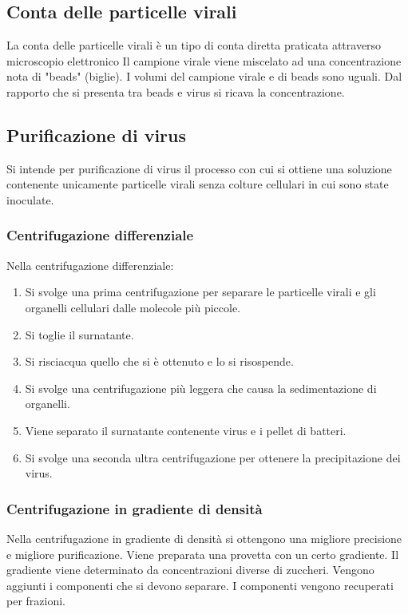 	\subsection{Conta delle particelle virali}
	La conta delle particelle virali \`e un tipo di conta diretta praticata attraverso microscopio elettronico
	Il campione virale viene miscelato ad una concentrazione nota di "beads" (biglie). 
	I volumi del campione virale e di beads sono uguali. 
	Dal rapporto che si presenta tra beads e virus si ricava la concentrazione. 

	\subsection{Purificazione di virus}
	Si intende per purificazione di virus il processo con cui si ottiene una soluzione contenente unicamente particelle virali senza colture cellulari in cui sono state inoculate.

		\subsubsection{Centrifugazione differenziale}
		Nella centrifugazione differenziale:
		\begin{multicols}{2}
			\begin{enumerate}
				\item Si svolge una prima centrifugazione per separare le particelle virali e gli organelli cellulari dalle molecole più piccole.
    				\item Si toglie il surnatante.
    				\item Si risciacqua quello che si è ottenuto e lo si risospende.
    				\item Si svolge una centrifugazione pi\`u leggera che causa la sedimentazione di organelli.
				\item Viene separato il surnatante contenente virus e i pellet di batteri.
    				\item Si svolge una seconda ultra centrifugazione per ottenere la precipitazione dei virus. 
			\end{enumerate}
		\end{multicols}
		
	\subsubsection{Centrifugazione in gradiente di densità}
	Nella centrifugazione in gradiente di densit\`a si ottengono una migliore precisione e migliore purificazione. 
	Viene preparata una provetta con un certo gradiente.
	Il gradiente viene determinato da concentrazioni diverse di zuccheri. 
	Vengono aggiunti i componenti che si devono separare.
	I componenti vengono recuperati per frazioni.

